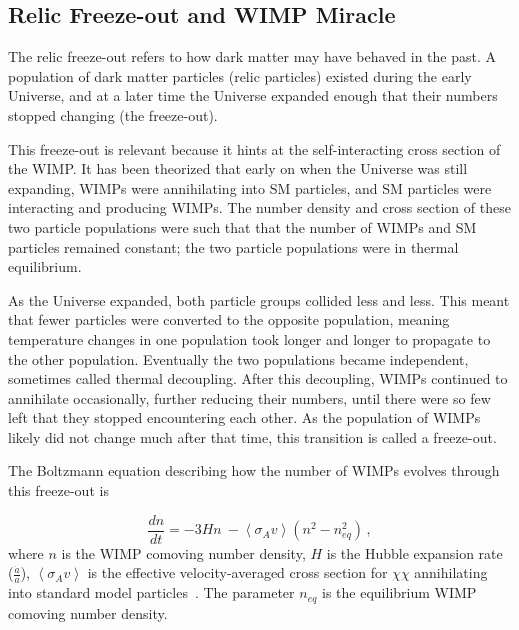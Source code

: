 \subsection{Relic Freeze-out and WIMP Miracle}

The relic freeze-out refers to how dark matter may have behaved in the past.
A population of dark matter particles (relic particles) existed during the early Universe, and at a later time the Universe expanded enough that their numbers stopped changing (the freeze-out).

This freeze-out is relevant because it hints at the self-interacting cross section of the WIMP.
It has been theorized that early on when the Universe was still expanding, WIMPs were annihilating into SM particles, and SM particles were interacting and producing WIMPs.
The number density and cross section of these two particle populations were such that that the number of WIMPs and SM particles remained constant; the two particle populations were in thermal equilibrium.

As the Universe expanded, both particle groups collided less and less.
This meant that fewer particles were converted to the opposite population, meaning temperature changes in one population took longer and longer to propagate to the other population.
Eventually the two populations became independent, sometimes called thermal decoupling.
After this decoupling, WIMPs continued to annihilate occasionally, further reducing their numbers, until there were so few left that they stopped encountering each other.
As the population of WIMPs likely did not change much after that time, this transition is called a freeze-out.

The Boltzmann equation describing how the number of WIMPs evolves through this freeze-out is 

\begin{equation}\label{eqn:boltzmann_relic}
  \frac{dn}{dt} = - 3 H n \: - \left \langle \sigma_{A} v \right \rangle \left ( n^2 - n_{eq}^2 \right ) \,,
\end{equation}
where $n$ is the WIMP comoving number density, $H$ is the Hubble expansion rate ($\frac{\dot{a}}{a}$), $\left \langle \sigma_{A} v \right \rangle$ is the effective velocity-averaged cross section for $\chi\chi$ annihilating into standard model particles~\cite{wells_relic}.
The parameter $n_{eq}$ is the equilibrium WIMP comoving number density.

